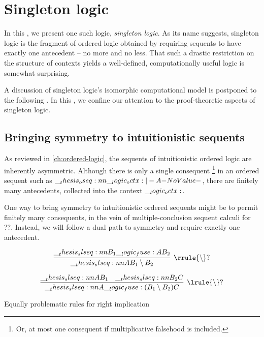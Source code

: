 \chapter{Singleton logic}\label{ch:singleton-logic}



In this , we present one such logic, \emph{singleton logic}.
As its name suggests, singleton logic is the fragment of ordered logic obtained by requiring sequents to have exactly one antecedent -- no more and no less.
That such a drastic restriction on the structure of contexts yields a well-defined, computationally useful logic is somewhat surprising.

A discussion of singleton logic's isomorphic computational model is postponed to the following .
In this , we confine our attention to the proof-theoretic aspects of singleton logic.

\section{Bringing symmetry to intuitionistic sequents}

As reviewed in \cref{ch:ordered-logic}, the sequents of intuitionistic ordered logic are inherently asymmetric.
Although there is only a single consequent%
\footnote{Or, at most one consequent if multiplicative falsehood is included.}
in an ordered sequent such as $\oseq{\octx |- A}$, there are finitely many antecedents, collected into the context $\__logic_octx:$.

One way to bring symmetry to intuitionistic ordered sequents might be to permit finitely many consequents, in the vein of multiple-conclusion sequent calculi for ??\autocite{??}.
Instead, we will follow a dual path to symmetry and require exactly one antecedent.

\begin{equation*}
  \infer[\rrule{\limp}?]{\slseq{A |- B_1 \limp B_2}}{
    \slseq{B_1 \fuse A |- B_2}}
\end{equation*}

\begin{equation*}
  \infer[\lrule{\limp}?]{\slseq{A \fuse (B_1 \limp B_2) |- C}}{
    \slseq{A |- B_1} & \slseq{B_2 |- C}}
\end{equation*}

\begin{marginfigure}
  \caption{Equally problematic rules for right implication}
\end{marginfigure}

